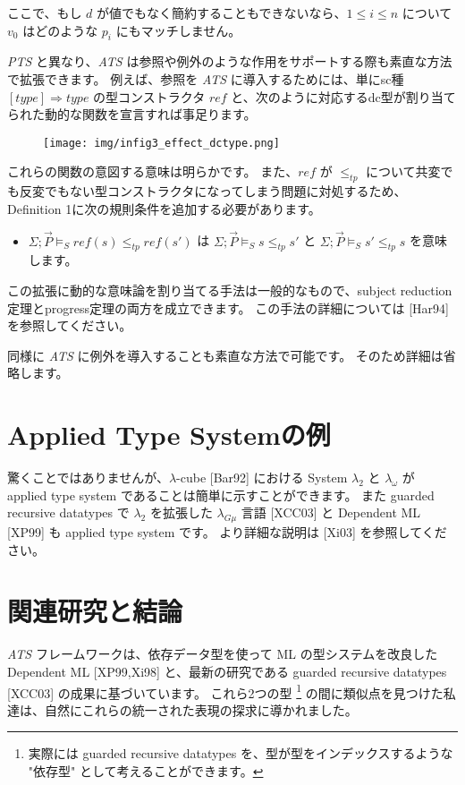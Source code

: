 \documentclass[submit,techreq,noauthor,onecolumn]{ipsj}
\begin{document}
\noindent ここで、もし $d$ が値でもなく簡約することもできないなら、$1 \leq i \leq n$ について $v_0$ はどのような $p_i$ にもマッチしません。

{\it PTS} と異なり、{\it ATS} は参照や例外のような作用をサポートする際も素直な方法で拡張できます。
例えば、参照を {\it ATS} に導入するためには、単にsc種 $[type] \Rightarrow type$ の型コンストラクタ $ref$ と、次のように対応するdc型が割り当てられた動的な関数を宣言すれば事足ります。

\begin{figure}[h]
\centering
\texttt{[image: img/infig3\_effect\_dctype.png]}
\end{figure}

これらの関数の意図する意味は明らかです。
また、$ref$ が $\leq_{tp}$ について共変でも反変でもない型コンストラクタになってしまう問題に対処するため、Definition 1に次の規則条件を追加する必要があります。

\begin{itemize}
\item $\Sigma; \vec{P} \models_S ref(s) \leq_{tp} ref(s')$ は $\Sigma; \vec{P} \models_S s \leq_{tp} s'$ と $\Sigma; \vec{P} \models_S s' \leq_{tp} s$ を意味します。
\end{itemize}

\noindent この拡張に動的な意味論を割り当てる手法は一般的なもので、subject reduction定理とprogress定理の両方を成立できます。
この手法の詳細については [Har94] を参照してください。

同様に {\it ATS} に例外を導入することも素直な方法で可能です。
そのため詳細は省略します。

\section{Applied Type Systemの例}

驚くことではありませんが、$\lambda$-cube [Bar92] における System $\lambda_2$ と $\lambda_{\omega}$ が applied type system であることは簡単に示すことができます。
また guarded recursive datatypes で $\lambda_2$ を拡張した $\lambda_{G\mu}$ 言語 [XCC03] と Dependent ML [XP99] も applied type system です。
より詳細な説明は [Xi03] を参照してください。

\section{関連研究と結論}

{\it ATS} フレームワークは、依存データ型を使って ML の型システムを改良した Dependent ML [XP99,Xi98] と、最新の研究である guarded recursive datatypes [XCC03] の成果に基づいています。
これら2つの型
\footnote{実際には guarded recursive datatypes を、型が型をインデックスするような "依存型" として考えることができます。}
の間に類似点を見つけた私達は、自然にこれらの統一された表現の探求に導かれました。
\end{document}
